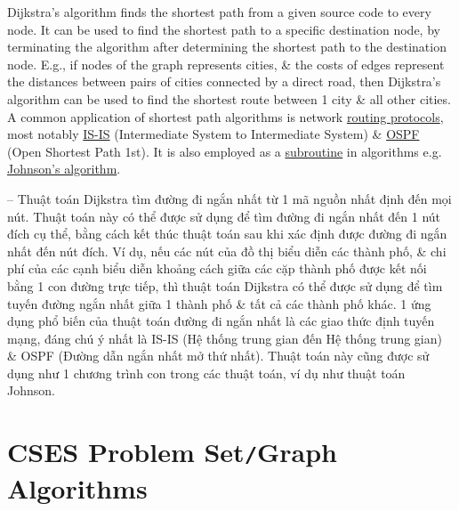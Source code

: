 \documentclass[oneside]{book}
\begin{document}
Dijkstra's algorithm finds the shortest path from a given source code to every node. It can be used to find the shortest path to a specific destination node, by terminating the algorithm after determining the shortest path to the destination node. E.g., if nodes of the graph represents cities, \& the costs of edges represent the distances between pairs of cities connected by a direct road, then Dijkstra's algorithm can be used to find the shortest route between 1 city \& all other cities. A common application of shortest path algorithms is network \href{https://en.wikipedia.org/wiki/Routing_protocol}{routing protocols}, most notably \href{https://en.wikipedia.org/wiki/IS-IS}{IS-IS} (Intermediate System to Intermediate System) \& \href{https://en.wikipedia.org/wiki/Open_Shortest_Path_First}{OSPF} (Open Shortest Path 1st). It is also employed as a \href{https://en.wikipedia.org/wiki/Subroutine}{subroutine} in algorithms e.g. \href{https://en.wikipedia.org/wiki/Johnson%27s_algorithm}{Johnson's algorithm}.

-- Thuật toán Dijkstra tìm đường đi ngắn nhất từ 1 mã nguồn nhất định đến mọi nút. Thuật toán này có thể được sử dụng để tìm đường đi ngắn nhất đến 1 nút đích cụ thể, bằng cách kết thúc thuật toán sau khi xác định được đường đi ngắn nhất đến nút đích. Ví dụ, nếu các nút của đồ thị biểu diễn các thành phố, \& chi phí của các cạnh biểu diễn khoảng cách giữa các cặp thành phố được kết nối bằng 1 con đường trực tiếp, thì thuật toán Dijkstra có thể được sử dụng để tìm tuyến đường ngắn nhất giữa 1 thành phố \& tất cả các thành phố khác. 1 ứng dụng phổ biến của thuật toán đường đi ngắn nhất là các giao thức định tuyến mạng, đáng chú ý nhất là IS-IS (Hệ thống trung gian đến Hệ thống trung gian) \& OSPF (Đường dẫn ngắn nhất mở thứ nhất). Thuật toán này cũng được sử dụng như 1 chương trình con trong các thuật toán, ví dụ như thuật toán Johnson.


\chapter{CSES Problem Set{\tt/}Graph Algorithms}
\end{document}
